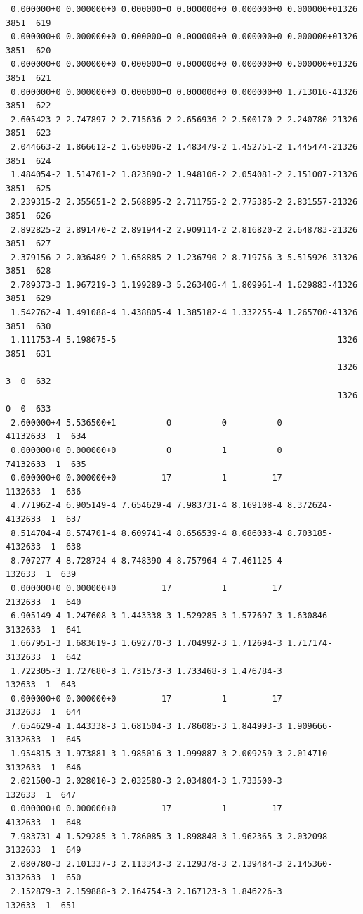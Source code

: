 \begin{verbatim}
 0.000000+0 0.000000+0 0.000000+0 0.000000+0 0.000000+0 0.000000+01326 3851  619
 0.000000+0 0.000000+0 0.000000+0 0.000000+0 0.000000+0 0.000000+01326 3851  620
 0.000000+0 0.000000+0 0.000000+0 0.000000+0 0.000000+0 0.000000+01326 3851  621
 0.000000+0 0.000000+0 0.000000+0 0.000000+0 0.000000+0 1.713016-41326 3851  622
 2.605423-2 2.747897-2 2.715636-2 2.656936-2 2.500170-2 2.240780-21326 3851  623
 2.044663-2 1.866612-2 1.650006-2 1.483479-2 1.452751-2 1.445474-21326 3851  624
 1.484054-2 1.514701-2 1.823890-2 1.948106-2 2.054081-2 2.151007-21326 3851  625
 2.239315-2 2.355651-2 2.568895-2 2.711755-2 2.775385-2 2.831557-21326 3851  626
 2.892825-2 2.891470-2 2.891944-2 2.909114-2 2.816820-2 2.648783-21326 3851  627
 2.379156-2 2.036489-2 1.658885-2 1.236790-2 8.719756-3 5.515926-31326 3851  628
 2.789373-3 1.967219-3 1.199289-3 5.263406-4 1.809961-4 1.629883-41326 3851  629
 1.542762-4 1.491088-4 1.438805-4 1.385182-4 1.332255-4 1.265700-41326 3851  630
 1.111753-4 5.198675-5                                            1326 3851  631
                                                                  1326 3  0  632
                                                                  1326 0  0  633
 2.600000+4 5.536500+1          0          0          0         41132633  1  634
 0.000000+0 0.000000+0          0          1          0         74132633  1  635
 0.000000+0 0.000000+0         17          1         17          1132633  1  636
 4.771962-4 6.905149-4 7.654629-4 7.983731-4 8.169108-4 8.372624-4132633  1  637
 8.514704-4 8.574701-4 8.609741-4 8.656539-4 8.686033-4 8.703185-4132633  1  638
 8.707277-4 8.728724-4 8.748390-4 8.757964-4 7.461125-4           132633  1  639
 0.000000+0 0.000000+0         17          1         17          2132633  1  640
 6.905149-4 1.247608-3 1.443338-3 1.529285-3 1.577697-3 1.630846-3132633  1  641
 1.667951-3 1.683619-3 1.692770-3 1.704992-3 1.712694-3 1.717174-3132633  1  642
 1.722305-3 1.727680-3 1.731573-3 1.733468-3 1.476784-3           132633  1  643
 0.000000+0 0.000000+0         17          1         17          3132633  1  644
 7.654629-4 1.443338-3 1.681504-3 1.786085-3 1.844993-3 1.909666-3132633  1  645
 1.954815-3 1.973881-3 1.985016-3 1.999887-3 2.009259-3 2.014710-3132633  1  646
 2.021500-3 2.028010-3 2.032580-3 2.034804-3 1.733500-3           132633  1  647
 0.000000+0 0.000000+0         17          1         17          4132633  1  648
 7.983731-4 1.529285-3 1.786085-3 1.898848-3 1.962365-3 2.032098-3132633  1  649
 2.080780-3 2.101337-3 2.113343-3 2.129378-3 2.139484-3 2.145360-3132633  1  650
 2.152879-3 2.159888-3 2.164754-3 2.167123-3 1.846226-3           132633  1  651

\end{verbatim}
